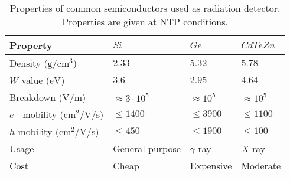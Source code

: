 \begin{table}[!ht]
	\centering
	\caption[]{Properties of common semiconductors \cite{NSM2005,Eisen1996} used as radiation detector. Properties are given at NTP conditions.}
	\label{chap3:semiconductor}
	\begin{tabularx}{\linewidth}{lXXX}
    \toprule
    Property & $Si$ & $Ge$ & $CdTeZn$ \\
    \midrule
    Density ($\mathrm{g/cm^3}$)& $2.33$  & $5.32$ & $5.78$ \\
    $W$ value ($\mathrm{eV}$) & $3.6$ & $2.95$ & $4.64$ \\
    Breakdown ($\mathrm{V/m}$) & $\approx 3\cdot10^5$ & $\approx 10^5$ & $\approx 10^5$\\
    $e^{-}$ mobility ($\mathrm{cm^{2}/V/s}$) & $\leq 1400$ & $\leq 3900$ & $\leq 1100$\\
    $h$ mobility ($\mathrm{cm^{2}/V/s}$) & $\leq 450$ & $\leq 1900$ & $\leq 100$ \\
    Usage & General purpose & $\gamma$-ray & $X$-ray\\
    Cost & Cheap & Expensive & Moderate\\
		\bottomrule
	\end{tabularx}
\end{table}
